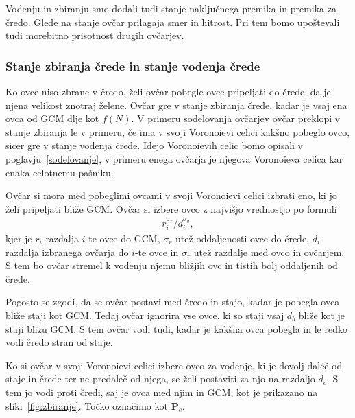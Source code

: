 Vodenju in zbiranju smo dodali tudi stanje naključnega premika in premika za čredo. Glede na stanje ovčar prilagaja smer in hitrost. Pri tem bomo upoštevali tudi morebitno prisotnost drugih ovčarjev.

\subsubsection{Stanje zbiranja črede in stanje vodenja črede}\label{zbiranje}

Ko ovce niso zbrane v čredo, želi ovčar pobegle ovce pripeljati do črede, da je njena velikost znotraj želene. Ovčar gre v stanje zbiranja črede, kadar je vsaj ena ovca od GCM dlje kot $f(N)$. V primeru sodelovanja ovčarjev ovčar preklopi v stanje zbiranja le v primeru, če ima v svoji Voronoievi celici kakšno pobeglo ovco, sicer gre v stanje vodenja črede. Idejo Voronoievih celic bomo opisali v poglavju~\ref{sodelovanje}, v primeru enega ovčarja je njegova Voronoieva celica kar enaka celotnemu pašniku.

Ovčar si mora med pobeglimi ovcami v svoji Voronoievi celici izbrati eno, ki jo želi pripeljati bliže GCM. Ovčar si izbere ovco z najvišjo vrednostjo po formuli
\begin{align}
r_i^{\sigma_r} / d_i^{\sigma_d}, \label{eq:zbiranje}
\end{align}
kjer je $r_i$ razdalja $i$-te ovce do GCM, $\sigma_r$ utež oddaljenosti ovce do črede, $d_{i}$ razdalja izbranega ovčarja do $i$-te ovce in $\sigma_r$ utež razdalje med ovco in ovčarjem. S tem bo ovčar stremel k vodenju njemu bližjih ovc in tistih bolj oddaljenih od črede.

Pogosto se zgodi, da se ovčar postavi med čredo in stajo, kadar je pobegla ovca bliže staji kot GCM. Tedaj ovčar ignorira vse ovce, ki so staji vsaj $d_b$ bliže kot je staji blizu GCM. S tem ovčar vodi tudi, kadar je kakšna ovca pobegla in le redko vodi čredo stran od staje.

Ko si ovčar v svoji Voronoievi celici izbere ovco za vodenje, ki je dovolj daleč od staje in črede ter ne predaleč od njega, se želi postaviti za njo na razdaljo $d_c$. S tem jo vodi proti čredi, saj je ovca med njim in GCM, kot je prikazano na sliki~\ref{fig:zbiranje}. Točko označimo kot $\mathbf{P}_c$.

